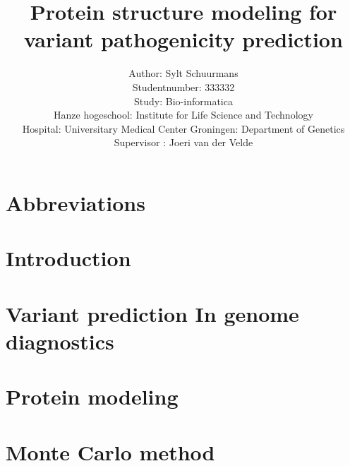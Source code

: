 \documentclass[10pt]{article}
\begin{document}
	\title{Protein structure modeling for variant pathogenicity prediction}
	\author{Author: Sylt Schuurmans\\
		Studentnumber: 333332\\
		Study: Bio-informatica\\
		Hanze hogeschool: Institute for Life Science and Technology\\
		Hospital: Universitary Medical Center Groningen: Department of Genetics\\
		Supervisor : Joeri van der Velde}
	\maketitle
	\newpage
	
	
	
	\tableofcontents
	\newpage
	
	\listoffigures
	\newpage
	
	\section*{Abbreviations}
	
	\label{section:Chap_Abbreviations}
	\newpage
	
	\section*{Introduction}
	
	\label{section:Chap_Introduction}
	\newpage
	
	
	\section{Variant prediction In genome diagnostics}
	
	\label{section:Chap_Variant_Prediction_In_Genome_Diagnostics}
	\newpage
		
	\section{Protein modeling}
	
	\label{section:Chap_Protein_Modeling_Techniques}
	\newpage
	
	\section{Monte Carlo method}
	
	\label{section:Chap_Monte_Carlo}
	\newpage
	
\end{document}
